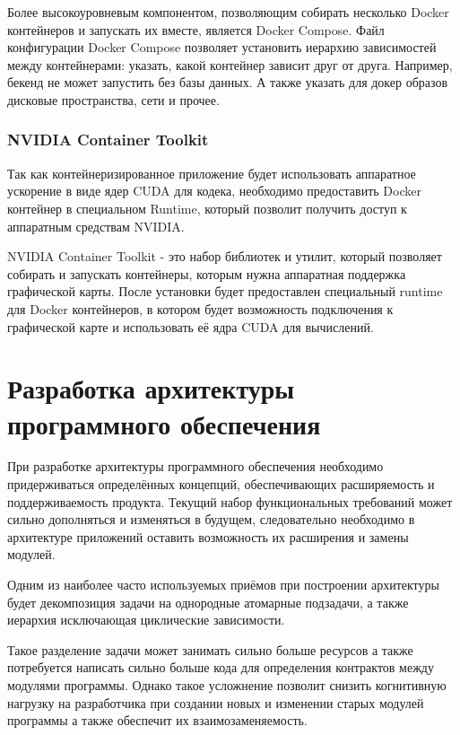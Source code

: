 \documentclass[14pt]{extarticle}
\begin{document}
Более высокоуровневым компонентом, позволяющим собирать несколько Docker контейнеров и запускать их вместе, является 
Docker Compose. Файл конфигурации Docker Compose позволяет установить иерархию зависимостей между контейнерами: указать, 
какой контейнер зависит друг от друга. Например, бекенд не может запустить без базы данных. А также указать для 
докер образов дисковые пространства, сети и прочее.

\subsubsection{NVIDIA Container Toolkit}

Так как контейнеризированное приложение будет использовать аппаратное ускорение в виде ядер CUDA для кодека, необходимо предоставить
Docker контейнер в специальном Runtime, который позволит получить доступ к аппаратным средствам NVIDIA. 

NVIDIA Container Toolkit - это набор библиотек и утилит, который позволяет собирать и запускать контейнеры, которым
нужна аппаратная поддержка графической карты. После установки будет предоставлен специальный runtime для Docker контейнеров, 
в котором будет возможность подключения к графической карте и использовать её ядра CUDA для вычислений.

\section{Разработка архитектуры программного обеспечения}

При разработке архитектуры программного обеспечения необходимо придерживаться определённых концепций, обеспечивающих
расширяемость и поддерживаемость продукта. Текущий набор функциональных требований может сильно дополняться
и изменяться в будущем, следовательно необходимо в архитектуре приложений оставить возможность
их расширения и замены модулей. 

Одним из наиболее часто используемых приёмов при построении архитектуры будет декомпозиция задачи на однородные атомарные подзадачи,
а также иерархия исключающая циклические зависимости. 

Такое разделение задачи может занимать сильно больше ресурсов а также потребуется написать сильно больше кода для определения
контрактов между модулями программы. Однако такое усложнение позволит снизить когнитивную нагрузку на разработчика
при создании новых и изменении старых модулей программы а также обеспечит их взаимозаменяемость.
\end{document}
